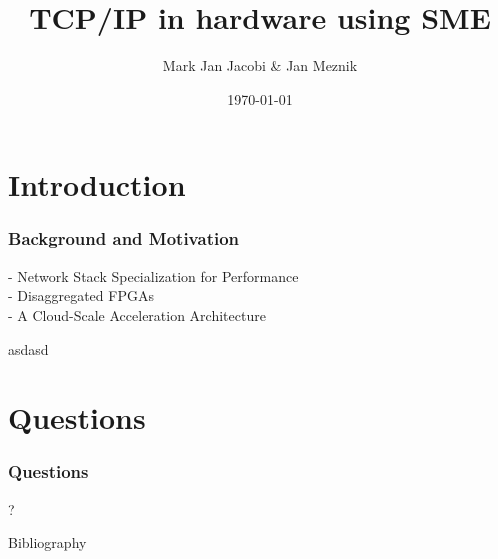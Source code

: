 \documentclass{beamer}
\title{TCP/IP in hardware using SME}
\author{Mark Jan Jacobi \& Jan Meznik}
\institute{University of Copenhagen}
\date{\today}
\begin{document}
\frame{\titlepage}

\section{Introduction}
\begin{frame}
  \frametitle{Background and Motivation}

- Network Stack Specialization for Performance\\
- Disaggregated FPGAs\\
- A Cloud-Scale Acceleration Architecture



\end{frame}


\begin{frame}

asdasd\cite{sco}
\end{frame}

\begin{frame}

\end{frame}



\section{Questions}
\begin{frame}
  \frametitle{Questions}
  \begin{center}
    ?
  \end{center}
\end{frame}

\begin{frame}{Bibliography}


\end{frame}
\end{document}
